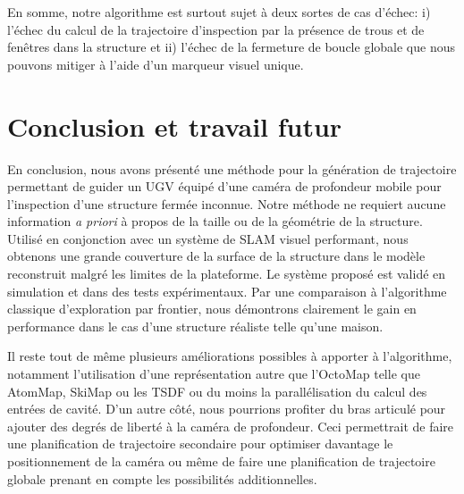 En somme, notre algorithme est surtout sujet à deux sortes de cas d'échec: i) l'échec du calcul de la trajectoire d'inspection par la présence de trous et de fenêtres dans la structure et ii) l'échec de la fermeture de boucle globale que nous pouvons mitiger à l'aide d'un marqueur visuel unique.

\section{Conclusion et travail futur}

En conclusion, nous avons présenté une méthode pour la génération de trajectoire permettant de guider un UGV équipé d'une caméra de profondeur mobile pour l'inspection d'une structure fermée inconnue. Notre méthode ne requiert aucune information \textit{a priori} à propos de la taille ou de la géométrie de la structure. Utilisé en conjonction avec un système de SLAM visuel performant, nous obtenons une grande couverture de la surface de la structure dans le modèle reconstruit malgré les limites de la plateforme. Le système proposé est validé en simulation et dans des tests expérimentaux. Par une comparaison à l'algorithme classique d'exploration par frontier, nous démontrons clairement le gain en performance dans le cas d'une structure réaliste telle qu'une maison.

Il reste tout de même plusieurs améliorations possibles à apporter à l'algorithme, notamment l'utilisation d'une représentation autre que l'OctoMap telle que AtomMap, SkiMap ou les TSDF ou du moins la parallélisation du calcul des entrées de cavité. D'un autre côté, nous pourrions profiter du bras articulé pour ajouter des degrés de liberté à la caméra de profondeur. Ceci permettrait de faire une planification de trajectoire secondaire pour optimiser davantage le positionnement de la caméra ou même de faire une planification de trajectoire globale prenant en compte les possibilités additionnelles.
